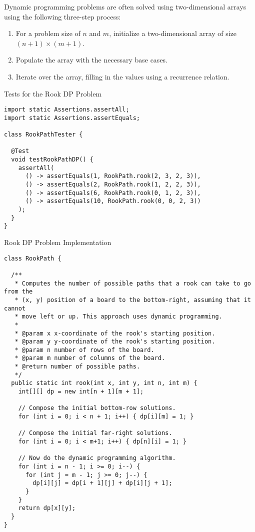 Dynamic programming problems are often solved using two-dimensional arrays using the following three-step process: 

\begin{enumerate}
  \item For a problem size of $n$ and $m$, initialize a two-dimensional array of size $(n + 1) \times (m + 1)$.
  \item Populate the array with the necessary base cases.
  \item Iterate over the array, filling in the values using a recurrence relation.
\end{enumerate}

\begin{cl}{Tests for the Rook DP Problem}
\begin{lstlisting}[language=MyJava]
import static Assertions.assertAll;
import static Assertions.assertEquals;

class RookPathTester {

  @Test
  void testRookPathDP() {
    assertAll(
      () -> assertEquals(1, RookPath.rook(2, 3, 2, 3)),
      () -> assertEquals(2, RookPath.rook(1, 2, 2, 3)),
      () -> assertEquals(6, RookPath.rook(0, 1, 2, 3)),
      () -> assertEquals(10, RookPath.rook(0, 0, 2, 3))
    );
  }
}
\end{lstlisting}
\end{cl}

\begin{cl}{Rook DP Problem Implementation}
\begin{lstlisting}[language=MyJava]
class RookPath {

  /**
   * Computes the number of possible paths that a rook can take to go from the
   * (x, y) position of a board to the bottom-right, assuming that it cannot
   * move left or up. This approach uses dynamic programming.
   * 
   * @param x x-coordinate of the rook's starting position.
   * @param y y-coordinate of the rook's starting position.
   * @param n number of rows of the board.
   * @param m number of columns of the board.
   * @return number of possible paths.
   */
  public static int rook(int x, int y, int n, int m) {
    int[][] dp = new int[n + 1][m + 1];

    // Compose the initial bottom-row solutions.
    for (int i = 0; i < n + 1; i++) { dp[i][m] = 1; }

    // Compose the initial far-right solutions.
    for (int i = 0; i < m+1; i++) { dp[n][i] = 1; }

    // Now do the dynamic programming algorithm.
    for (int i = n - 1; i >= 0; i--) {
      for (int j = m - 1; j >= 0; j--) {
        dp[i][j] = dp[i + 1][j] + dp[i][j + 1];
      }
    }
    return dp[x][y];
  }
}
\end{lstlisting}
\end{cl}

